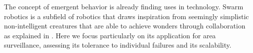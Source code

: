 \par The concept of emergent behavior is already finding uses in technology. Swarm robotics is a subfield of robotics that draws inspiration from seemingly simplistic non-intelligent creatures that are able to achieve wonders through collaboration as explained in \parencite{schranz_swarm_2020}. Here we focus particularly on its application for area surveillance, assessing its tolerance to individual failures and its scalability. 
